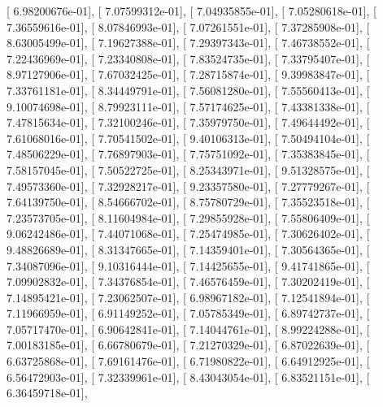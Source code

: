 \documentclass{article}
\begin{document}
       [  6.98200676e-01],
       [  7.07599312e-01],
       [  7.04935855e-01],
       [  7.05280618e-01],
       [  7.36559616e-01],
       [  8.07846993e-01],
       [  7.07261551e-01],
       [  7.37285908e-01],
       [  8.63005499e-01],
       [  7.19627388e-01],
       [  7.29397343e-01],
       [  7.46738552e-01],
       [  7.22436969e-01],
       [  7.23340808e-01],
       [  7.83524735e-01],
       [  7.33795407e-01],
       [  8.97127906e-01],
       [  7.67032425e-01],
       [  7.28715874e-01],
       [  9.39983847e-01],
       [  7.33761181e-01],
       [  8.34449791e-01],
       [  7.56081280e-01],
       [  7.55560413e-01],
       [  9.10074698e-01],
       [  8.79923111e-01],
       [  7.57174625e-01],
       [  7.43381338e-01],
       [  7.47815634e-01],
       [  7.32100246e-01],
       [  7.35979750e-01],
       [  7.49644492e-01],
       [  7.61068016e-01],
       [  7.70541502e-01],
       [  9.40106313e-01],
       [  7.50494104e-01],
       [  7.48506229e-01],
       [  7.76897903e-01],
       [  7.75751092e-01],
       [  7.35383845e-01],
       [  7.58157045e-01],
       [  7.50522725e-01],
       [  8.25343971e-01],
       [  9.51328575e-01],
       [  7.49573360e-01],
       [  7.32928217e-01],
       [  9.23357580e-01],
       [  7.27779267e-01],
       [  7.64139750e-01],
       [  8.54666702e-01],
       [  8.75780729e-01],
       [  7.35523518e-01],
       [  7.23573705e-01],
       [  8.11604984e-01],
       [  7.29855928e-01],
       [  7.55806409e-01],
       [  9.06242486e-01],
       [  7.44071068e-01],
       [  7.25474985e-01],
       [  7.30626402e-01],
       [  9.48826689e-01],
       [  8.31347665e-01],
       [  7.14359401e-01],
       [  7.30564365e-01],
       [  7.34087096e-01],
       [  9.10316444e-01],
       [  7.14425655e-01],
       [  9.41741865e-01],
       [  7.09902832e-01],
       [  7.34376854e-01],
       [  7.46576459e-01],
       [  7.30202419e-01],
       [  7.14895421e-01],
       [  7.23062507e-01],
       [  6.98967182e-01],
       [  7.12541894e-01],
       [  7.11966959e-01],
       [  6.91149252e-01],
       [  7.05785349e-01],
       [  6.89742737e-01],
       [  7.05717470e-01],
       [  6.90642841e-01],
       [  7.14044761e-01],
       [  8.99224288e-01],
       [  7.00183185e-01],
       [  6.66780679e-01],
       [  7.21270329e-01],
       [  6.87022639e-01],
       [  6.63725868e-01],
       [  7.69161476e-01],
       [  6.71980822e-01],
       [  6.64912925e-01],
       [  6.56472903e-01],
       [  7.32339961e-01],
       [  8.43043054e-01],
       [  6.83521151e-01],
       [  6.36459718e-01],
\end{document}
